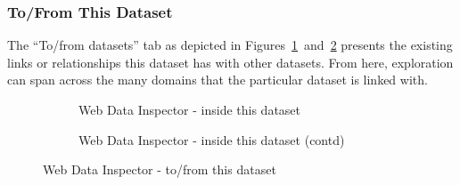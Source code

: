 \subsubsection{To/From This Dataset}

The ``To/from datasets'' tab as depicted in Figures~\ref{fig:wdi:toFromThisDataset1}~and~\ref{fig:wdi:toFromThisDataset2} presents the existing links or relationships this dataset has with other datasets. From here, exploration can span across the many domains that the particular dataset is linked with.

\begin{figure}
	\centering
	\begin{subfigure}{.9\textwidth}
		\centering
		\caption{Web Data Inspector - inside this dataset}
		\label{fig:wdi:toFromThisDataset1}
	\end{subfigure}
	\quad
	\begin{subfigure}{.9\textwidth}
		\centering
		\caption{Web Data Inspector - inside this dataset (contd)}
		\label{fig:wdi:toFromThisDataset2}
	\end{subfigure}
	\caption{Web Data Inspector - to/from this dataset}
	\label{fig:wdi:toFromThisDataset}
\end{figure}

